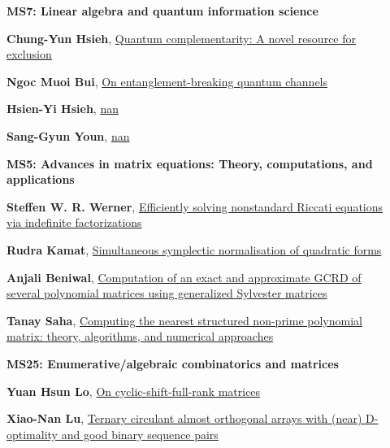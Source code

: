 \documentclass[ILAS2025-program.tex]{subfiles}
\begin{document}
\begin{description}
\begin{description}
    \item[] {\color{mstitle}\textbf{MS7: Linear algebra and quantum information science}} 
    \item[] \hypertarget{up0359}{}\textbf{Chung-Yun Hsieh}, \hyperlink{down0359}{Quantum complementarity: A novel resource for exclusion}
        \item[] \hypertarget{up0360}{}\textbf{Ngoc Muoi Bui}, \hyperlink{down0360}{On entanglement-breaking quantum channels}
        \item[] \hypertarget{up0361}{}\textbf{Hsien-Yi Hsieh}, \hyperlink{down0361}{nan}
        \item[] \hypertarget{up0362}{}\textbf{Sang-Gyun Youn}, \hyperlink{down0362}{nan}
        \end{description}
    \begin{description}
    \item[] {\color{mstitle}\textbf{MS5: Advances in matrix equations: Theory, computations, and applications}} 
    \item[] \hypertarget{up0363}{}\textbf{Steffen W. R. Werner}, \hyperlink{down0363}{Efficiently solving nonstandard Riccati equations via indefinite factorizations}
        \item[] \hypertarget{up0364}{}\textbf{Rudra Kamat}, \hyperlink{down0364}{Simultaneous symplectic normalisation of quadratic forms
}
        \item[] \hypertarget{up0365}{}\textbf{Anjali Beniwal}, \hyperlink{down0365}{Computation of an exact and approximate GCRD of several polynomial matrices using generalized Sylvester matrices}
        \item[] \hypertarget{up0366}{}\textbf{Tanay Saha}, \hyperlink{down0366}{Computing the nearest structured non-prime polynomial matrix: theory, algorithms, and numerical approaches}
        \end{description}
    \begin{description}
    \item[] {\color{mstitle}\textbf{MS25: Enumerative/algebraic combinatorics and matrices}} 
    \item[] \hypertarget{up0367}{}\textbf{Yuan Hsun Lo}, \hyperlink{down0367}{On cyclic-shift-full-rank matrices
}
        \item[] \hypertarget{up0368}{}\textbf{Xiao-Nan Lu}, \hyperlink{down0368}{Ternary circulant almost orthogonal arrays with (near) D-optimality and good binary sequence pairs}

\end{description}
\end{description}
\end{document}

